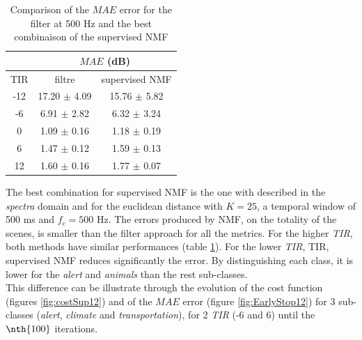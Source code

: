 \documentclass[twocolumn,a4paper,10pt]{article}
\begin{document}
\begin{table}[h]
\centering
\begin{tabular}{ccc}
    & \multicolumn{2}{c}{$MAE$ (dB)} \\ \hline
TIR & filtre & supervised NMF \\ \hline
 -12 & 17.20 $\pm$ 4.09 & 15.76 $\pm$ 5.82 \\
 -6 &  6.91 $\pm$ 2.82 & 6.32 $\pm$ 3.24\\
 0 & 1.09 $\pm$ 0.16 & 1.18 $\pm$ 0.19\\
  6 &  1.47 $\pm$ 0.12 & 1.59 $\pm$ 0.13\\
 12 &  1.60 $\pm$ 0.16 & 1.77 $\pm$ 0.07
\end{tabular}
\caption{Comparison of the $MAE$ error for the filter at 500 Hz and the best combinaison of the supervised NMF}
\label{tab:resultsComparison}
\end{table}


The best combination for supervised NMF is the one with described in the \textit{spectra} domain and for the euclidean distance with $K = 25$, a temporal window of 500 ms and $f_c = 500$ Hz. The errors produced by NMF, on the totality of the scenes, is smaller than the filter approach for all the metrics. For the higher \textit{TIR}, both methods have similar performances (table \ref{tab:resultsComparison}). For the lower \textit{TIR}, TIR, supervised NMF reduces significantly the error. By distinguishing each class, it is lower for the \textit{alert} and \textit{animals} than the rest sub-classes. \\

This difference can be illustrate through the evolution of the cost function (figures \ref{fig:costSup12}) and of the $MAE$ error (figure \ref{fig:EarlyStop12}) for 3 sub-classes (\textit{alert}, \textit{climate} and \textit{transportation}), for 2 \textit{TIR} (-6 and 6) until the $\nth {100}$ iterations.\\
\end{document}
